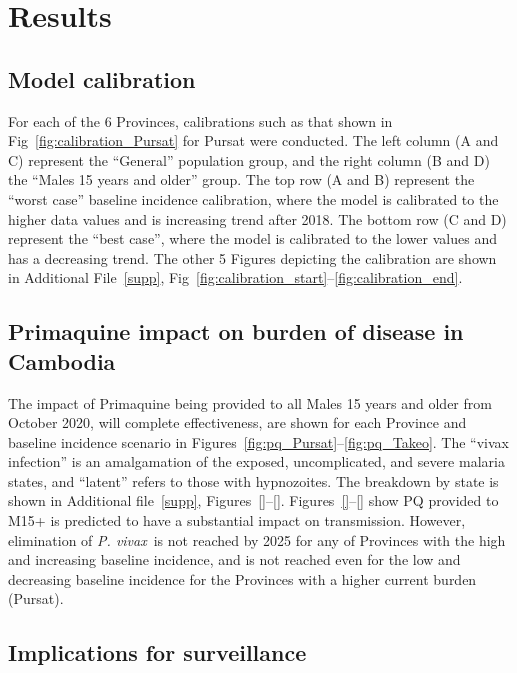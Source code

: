 \documentclass[doublespacing]{bmcart}
\newcommand{\pv}{\textit{P. vivax}}
\begin{document}
\section*{Results}

\subsection*{Model calibration}
For each of the 6 Provinces, calibrations such as that shown in Fig~\ref{fig:calibration_Pursat} for Pursat were conducted. The left column (A and C) represent the ``General'' population group, and the right column (B and D) the ``Males 15 years and older'' group. The top row (A and B) represent the ``worst case'' baseline incidence calibration, where the model is calibrated to the higher data values and is increasing trend after 2018. The bottom row (C and D) represent the ``best case'', where the model is calibrated to the lower values and has a decreasing trend. The other 5 Figures depicting the calibration are shown in Additional File~\ref{supp}, Fig~\ref{fig:calibration_start}--\ref{fig:calibration_end}.

\subsection*{Primaquine impact on burden of disease in Cambodia} \label{sec:impact}

The impact of Primaquine being provided to all Males 15 years and older from October 2020, will complete effectiveness, are shown for each Province and baseline incidence scenario in Figures~\ref{fig:pq_Pursat}--\ref{fig:pq_Takeo}. The ``vivax infection'' is an amalgamation of the exposed, uncomplicated, and severe malaria states, and ``latent'' refers to those with hypnozoites. The breakdown by state is shown in Additional file~\ref{supp}, Figures~\ref{}--\ref{}. Figures~\ref{}--\ref{} show PQ provided to M15+ is predicted to have a substantial impact on transmission. However, elimination of \pv~is not reached by 2025 for any of Provinces with the high and increasing baseline incidence, and is not reached even for the low and decreasing baseline incidence for the Provinces with a higher current burden (Pursat). 

\subsection*{Implications for surveillance}
\end{document}
